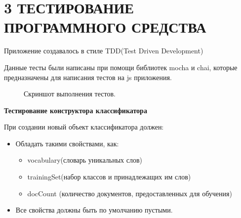 \documentclass[14pt,a4paper]{extreport}
\begin{document}
    \section*{\normalsize\hspace{4ex}3 ТЕСТИРОВАНИЕ ПРОГРАММНОГО СРЕДСТВА}
    \hspace{18pt} Приложение создавалось в стиле TDD(Test Driven Development)
    \\ \par Данные тесты были написаны при помощи библиотек mocha и chai, которые предназначены для написания тестов на js приложения.
    \begin{figure}[h]
    \caption{Скриншот выполнения тестов.}
    \label{ris:image}
    \end{figure}
    \newpage
    \hspace{18pt} \textbf{Тестирование конструктора классификатора}
    \\ \par При создании новый объект классификатора должен:
    \begin{itemize}
      \item  Обладать такими свойствами, как:
                \begin{itemize}
                  \item vocabulary(словарь уникальных слов)
                  \item trainingSet(набор классов и принадлежащих им слов)
                  \item docCount (количество документов, предоставленных для обучения)
                \end{itemize}
      \item Все свойства должны быть по умолчанию пустыми.
    \end{itemize}
\end{document}
